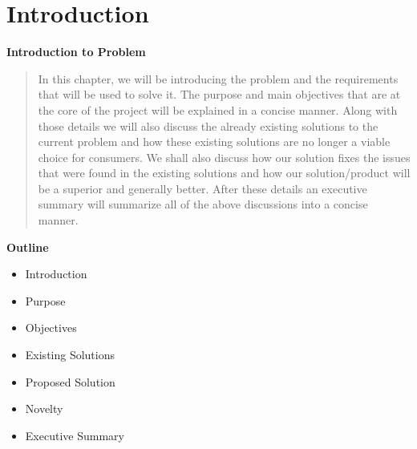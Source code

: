 \section{Introduction}

\vspace{20mm}

\Huge{\textbf{Introduction to Problem}}

\vspace{20mm}


\begin{abstract}
	In this chapter, we will be introducing the problem and the requirements that will be used to solve it. The purpose and main objectives that are at the core of the project will be explained in a concise manner. Along with those details we will also discuss the already existing solutions to the current problem and how these existing solutions are no longer a viable choice for consumers. We shall also discuss how our solution fixes the issues that were found in the existing solutions and how our solution/product will be a superior and generally better. After these details an executive summary will summarize all of the above discussions into a concise manner.
\end{abstract}

\vspace{20mm}






\large{\textbf{Outline}}

\begin{center}
	\begin{itemize}
		\item Introduction
		\item Purpose
		\item Objectives
		\item Existing Solutions
		\item Proposed Solution
		\item Novelty
		\item Executive Summary
	\end{itemize}
\end{center}
\pagebreak








